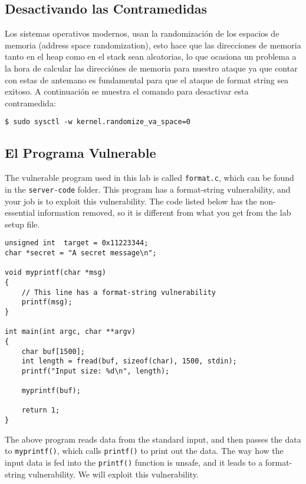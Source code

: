 \subsection{Desactivando las Contramedidas} 

Los sistemas operativos modernos, usan la randomización de los espacios de memoria (address space randomization), esto hace que las direcciones de memoria tanto en el heap como en el stack sean aleatorias, lo que ocasiona un problema a la hora de calcular las direcciónes de memoria para nuestro ataque ya que contar con estas de antemano es fundamental para que el ataque de format string sea exitoso. 
A continuación se muestra el comando para desactivar esta contramedida:


\begin{lstlisting}
$ sudo sysctl -w kernel.randomize_va_space=0
\end{lstlisting}


\subsection{El Programa Vulnerable}
\label{sec:vulnerable_program}

The vulnerable program used in this lab is called
\texttt{format.c}, which can be found in the \texttt{server-code} folder.
This program has a format-string vulnerability,
and your job is to exploit this vulnerability.
The code listed below has the non-essential information removed,
so it is different from what you get from the lab setup file.

\begin{lstlisting}[label=format:code, 
       caption={The vulnerable program \texttt{format.c} (with non-essential information removed)}]
unsigned int  target = 0x11223344;
char *secret = "A secret message\n";

void myprintf(char *msg)
{
    // This line has a format-string vulnerability
    printf(msg);
}

int main(int argc, char **argv)
{
    char buf[1500];
    int length = fread(buf, sizeof(char), 1500, stdin);
    printf("Input size: %d\n", length);

    myprintf(buf);

    return 1;
}
\end{lstlisting}

The above program reads data from the standard input, 
and then passes the data to \texttt{myprintf()}, 
which calls \texttt{printf()} to print out the data. 
The way how the input data is fed into the \texttt{printf()} function
is unsafe, and it leads to a format-string vulnerability. 
We will exploit this vulnerability. 


